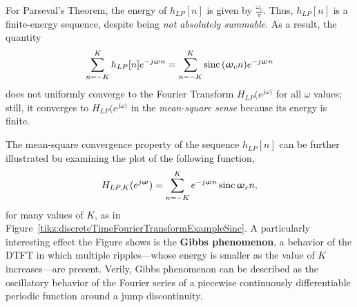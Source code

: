 \documentclass[\documentfontsize, twocolumn]{\classname}
\begin{document}
For Parseval's Theorem, the energy of $h_{LP}[n]$ is given by $\frac {\omega_c}{\pi}$. Thus, $h_{LP}[n]$ is a finite-energy sequence, despite being \emph{not absolutely summable}. As a result, the quantity
\[
    \sum_{n=-K}^K h_{LP}[n] e^{-j\upomega n} = \sum_{n=-K}^K \operatorname{sinc} {(\upomega_c n)} e^{-j\upomega n}
\]
does not uniformly converge to the Fourier Transform $H_{LP}(e^{j\omega)}$ for all $\omega$ values; still, it converges to $H_{LP}(e^{j\omega)}$ in the \emph{mean-square sense} because its energy is finite.

The mean-square convergence property of the sequence $h_{LP}[n]$ can be further illustrated bu examining the plot of the following function,
\[
    H_{LP,K}(e^{j\upomega}) = \sum_{n=-K}^K e^{-j\upomega n}\operatorname{sinc} {\upomega_c n},
\]
for many values of $K$, as in Figure~\ref{tikz:discreteTimeFourierTransformExampleSinc}. A particularly interesting effect the Figure shows is the \textbf{Gibbs phenomenon}, a behavior of the DTFT in which multiple ripples---whose energy is smaller as the value of $K$ increases---are present. Verily, Gibbs phenomenon can be described as the oscillatory behavior of the Fourier series of a piecewise continuously differentiable periodic function around a jump discontinuity.
\end{document}
